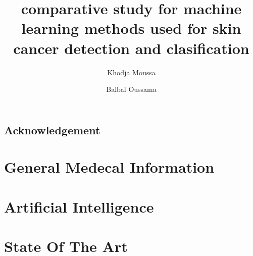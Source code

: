 \documentclass[12pt,a4paper]{report}
\title{comparative study for machine learning methods used for skin cancer detection and clasification}
\author{
	Khodja Moussa
	\and
	Balbal Oussama
}
\date{}
\begin{document}


\section*{Acknowledgement}
\newpage

\tableofcontents
\listoffigures
\listoftables
\newpage


\newpage


\chapter{General Medecal Information}





\chapter{Artificial Intelligence}


\chapter{State Of The Art}





\end{document}
